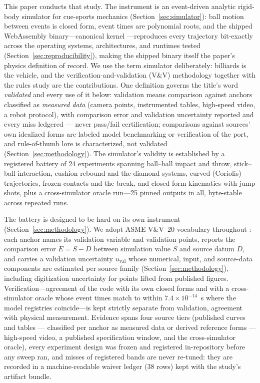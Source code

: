 This paper conducts that study. The instrument is an event-driven
analytic rigid-body simulator for cue-sports mechanics
(Section~\ref{sec:simulator}): ball motion between events is closed
form, event times are polynomial roots, and the shipped WebAssembly
binary---canonical kernel ---reproduces every
trajectory bit-exactly across the operating systems, architectures, and
runtimes tested (Section~\ref{sec:reproducibility}), making the shipped
binary itself the paper's physics definition
of record. We use the term simulator deliberately: billiards is the
vehicle, and the verification-and-validation (V\&V) methodology together
with the rules study are the contributions. One definition governs the
title's word \emph{validated} and every use of it below: validation means
comparison against anchors classified as \emph{measured data} (camera
points, instrumented tables, high-speed video, a robot protocol), with
comparison error and validation uncertainty reported and every miss
ledgered --- never pass/fail certification; comparisons against sources'
own idealized forms are labeled model benchmarking or verification of the
port, and rule-of-thumb lore is characterized, not validated
(Section~\ref{sec:methodology}). The simulator's validity is
established by a registered battery of 24 experiments spanning
ball--ball impact and throw, stick--ball interaction, cushion rebound
and the diamond systems, curved (Coriolis) trajectories, frozen contacts
and the break, and closed-form kinematics with jump shots, plus a
cross-simulator oracle run---25 pinned outputs in all, byte-stable
across repeated runs.

The battery is designed to be hard on its own instrument
(Section~\ref{sec:methodology}). We adopt ASME V\&V~20 vocabulary
throughout \citep{asme2009vv20}: each anchor names its validation
variable and validation points, reports the comparison error
$E = S - D$ between simulation value $S$ and source datum $D$, and
carries a validation uncertainty $u_{\mathrm{val}}$ whose numerical,
input, and source-data components are estimated per source family
(Section~\ref{sec:methodology}), including digitization uncertainty for
points lifted from published figures.
Verification---agreement of the code with its own closed forms and with
a cross-simulator oracle whose event times match to within
$7.4\times10^{-14}$~s where the model registries coincide---is kept
strictly separate from validation, agreement with physical measurement.
Evidence spans four source tiers (published curves and tables ---
classified per anchor as measured data or derived reference forms ---
high-speed video, a published specification window, and the
cross-simulator oracle), every
experiment design was frozen and registered in-repository before any
sweep ran, and
misses of registered bands are never re-tuned: they are recorded in a
machine-readable waiver ledger (38 rows) kept with the study's artifact
bundle.

